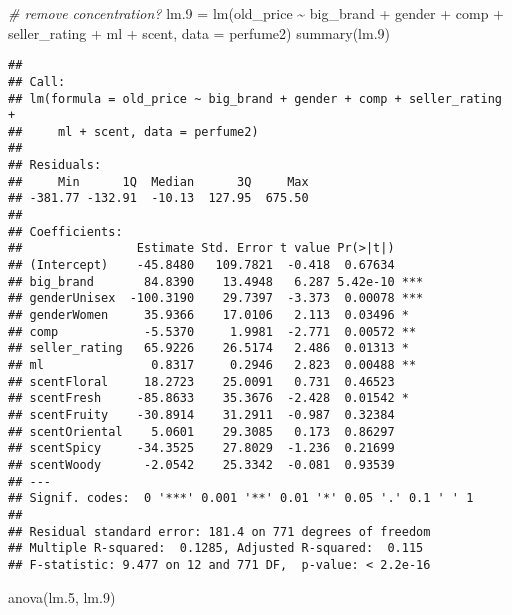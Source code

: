 \documentclass[
]{article}
\newenvironment{Shaded}{\begin{snugshade}}{\end{snugshade}}
\newcommand{\AttributeTok}[1]{\textcolor[rgb]{0.77,0.63,0.00}{#1}}
\newcommand{\CommentTok}[1]{\textcolor[rgb]{0.56,0.35,0.01}{\textit{#1}}}
\newcommand{\FloatTok}[1]{\textcolor[rgb]{0.00,0.00,0.81}{#1}}
\newcommand{\FunctionTok}[1]{\textcolor[rgb]{0.00,0.00,0.00}{#1}}
\newcommand{\NormalTok}[1]{#1}
\newcommand{\OtherTok}[1]{\textcolor[rgb]{0.56,0.35,0.01}{#1}}
\newcommand{\SpecialCharTok}[1]{\textcolor[rgb]{0.00,0.00,0.00}{#1}}
\begin{document}
\begin{Shaded}
\begin{Highlighting}[]
\CommentTok{\# remove concentration?}
\NormalTok{lm}\FloatTok{.9} \OtherTok{=} \FunctionTok{lm}\NormalTok{(old\_price }\SpecialCharTok{\textasciitilde{}}\NormalTok{ big\_brand }\SpecialCharTok{+}\NormalTok{ gender }\SpecialCharTok{+}\NormalTok{ comp }\SpecialCharTok{+}\NormalTok{ seller\_rating }\SpecialCharTok{+}
\NormalTok{            ml }\SpecialCharTok{+}\NormalTok{ scent, }\AttributeTok{data =}\NormalTok{ perfume2)}
\FunctionTok{summary}\NormalTok{(lm}\FloatTok{.9}\NormalTok{)}
\end{Highlighting}
\end{Shaded}

\begin{verbatim}
## 
## Call:
## lm(formula = old_price ~ big_brand + gender + comp + seller_rating + 
##     ml + scent, data = perfume2)
## 
## Residuals:
##     Min      1Q  Median      3Q     Max 
## -381.77 -132.91  -10.13  127.95  675.50 
## 
## Coefficients:
##                Estimate Std. Error t value Pr(>|t|)    
## (Intercept)    -45.8480   109.7821  -0.418  0.67634    
## big_brand       84.8390    13.4948   6.287 5.42e-10 ***
## genderUnisex  -100.3190    29.7397  -3.373  0.00078 ***
## genderWomen     35.9366    17.0106   2.113  0.03496 *  
## comp            -5.5370     1.9981  -2.771  0.00572 ** 
## seller_rating   65.9226    26.5174   2.486  0.01313 *  
## ml               0.8317     0.2946   2.823  0.00488 ** 
## scentFloral     18.2723    25.0091   0.731  0.46523    
## scentFresh     -85.8633    35.3676  -2.428  0.01542 *  
## scentFruity    -30.8914    31.2911  -0.987  0.32384    
## scentOriental    5.0601    29.3085   0.173  0.86297    
## scentSpicy     -34.3525    27.8029  -1.236  0.21699    
## scentWoody      -2.0542    25.3342  -0.081  0.93539    
## ---
## Signif. codes:  0 '***' 0.001 '**' 0.01 '*' 0.05 '.' 0.1 ' ' 1
## 
## Residual standard error: 181.4 on 771 degrees of freedom
## Multiple R-squared:  0.1285, Adjusted R-squared:  0.115 
## F-statistic: 9.477 on 12 and 771 DF,  p-value: < 2.2e-16
\end{verbatim}

\begin{Shaded}
\begin{Highlighting}[]
\FunctionTok{anova}\NormalTok{(lm}\FloatTok{.5}\NormalTok{, lm}\FloatTok{.9}\NormalTok{)}
\end{Highlighting}
\end{Shaded}
\end{document}
